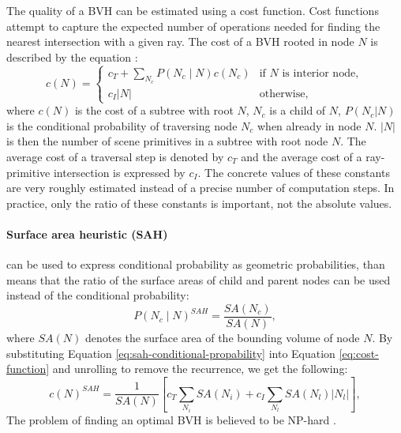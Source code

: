 The quality of a BVH can be estimated using a cost function. Cost functions attempt to capture the expected number of operations needed for finding the nearest intersection with a given ray. The cost of a BVH rooted in node $N$ is described by the equation \cite{Meister2021}:
\begin{equation}
    c(N) =
    \begin{cases}
        c_T + \displaystyle\sum_{N_c} P(N_c \mid N) c(N_c) & \text{if } N \text{ is interior node}, \\
        c_I \lvert N \rvert & \text{otherwise},
    \end{cases}
    \label{eq:cost-function}
\end{equation}
where $c(N)$ is the cost of a subtree with root $N$, $N_c$ is a child of $N$, $P(N_c|N)$ is the conditional probability of traversing node $N_c$ when already in node $N$. $|N|$ is then the number of scene primitives in a subtree with root node $N$. The average cost of a traversal step is denoted by $c_T$ and the average cost of a ray-primitive intersection is expressed by $c_I$. The concrete values of these constants are very roughly estimated instead of a precise number of computation steps. In practice, only the ratio of these constants is important, not the absolute values.

\paragraph{Surface area heuristic (SAH) \cite{GS87}} can be used to express conditional probability as geometric probabilities, than means that the ratio of the surface areas of child and parent nodes can be used instead of the conditional probability:
\begin{equation}
    P(N_c \mid N)^{SAH} = \frac{SA(N_c)}{SA(N)},
    \label{eq:sah-conditional-propability}
\end{equation}
where $SA(N)$ denotes the surface area of the bounding volume of node $N$. By substituting Equation \ref{eq:sah-conditional-propability} into Equation \ref{eq:cost-function} and unrolling to remove the recurrence, we get the following:
\begin{equation}
    c(N)^{SAH} = \frac{1}{SA(N)} \left[ c_T \sum_{N_i} SA(N_i) + c_I \sum_{N_l} SA(N_l) |N_l| \right], 
    \label{eq:placeholder_label}
\end{equation}
The problem of finding an optimal BVH is believed to be NP-hard \cite{AK13}.

